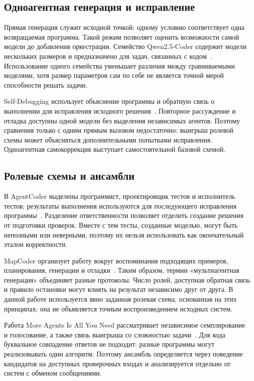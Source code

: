 \documentclass{misisarticle}
\begin{document}
\subsection{Одноагентная генерация и исправление}
Прямая генерация служит исходной точкой: одному условию соответствует одна возвращаемая программа. Такой режим позволяет оценить возможности самой модели до добавления оркестрации. Семейство Qwen2.5-Coder содержит модели нескольких размеров и предназначено для задач, связанных с кодом~\cite{qwen}. Использование одного семейства уменьшает различия между сравниваемыми моделями, хотя размер параметров сам по себе не является точной мерой способности решать задачи.

Self-Debugging использует объяснение программы и обратную связь о выполнении для исправления исходного решения~\cite{selfdebug}. Повторное рассуждение и отладка доступны одной модели без выделения независимых агентов. Поэтому сравнения только с одним прямым вызовом недостаточно: выигрыш ролевой схемы может объясняться дополнительными попытками исправления. Одноагентная самокоррекция выступает самостоятельной базовой схемой.

\subsection{Ролевые схемы и ансамбли}
В AgentCoder выделены программист, проектировщик тестов и исполнитель тестов; результаты выполнения используются для последующего исправления программы~\cite{agentcoder}. Разделение ответственности позволяет отделить создание решения от подготовки проверок. Вместе с тем тесты, созданные моделью, могут быть неполными или неверными, поэтому их нельзя использовать как окончательный эталон корректности.

MapCoder организует работу вокруг воспоминания подходящих примеров, планирования, генерации и отладки~\cite{mapcoder}. Таким образом, термин «мультиагентная генерация» объединяет разные протоколы. Число ролей, доступная обратная связь и правило остановки могут влиять на результат независимо друг от друга. В данной работе используется явно заданная ролевая схема, основанная на этих принципах; она не объявляется точным воспроизведением исходных систем.

Работа More Agents Is All You Need рассматривает независимое семплирование и голосование, а также связь выигрыша со сложностью задачи~\cite{forest}. Для кода буквальное совпадение ответов не подходит: разные программы могут реализовывать один алгоритм. Поэтому ансамбль определяется через поведение кандидатов на доступных проверочных входах и анализируется отдельно от систем с обменом сообщениями.
\end{document}
